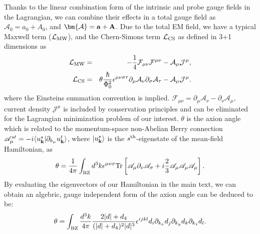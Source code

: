 \documentclass[aps,floatfix,prl]{revtex4}
\begin{document}
Thanks to the linear combination form of the intrinsic and probe gauge fields in the Lagrangian, we can combine their effects in a total gauge field as $\mathcal{A}_0=a_0+A_0$, and $\bm{\mathcal{A}}={\bf a}+{\bf A}$. Due to the total EM field, we have a typical Maxwell term ($\mathcal{L}_{\rm MW}$), and the Chern-Simons term $\mathcal{L}_{\rm CS}$ as defined in 3+1 dimensions as\cite{zhang_prb,JMoore,CSGL_rest}
\begin{eqnarray}
\mathcal{L}_{\rm MW}&=&-\frac{1}{4}\mathcal{F}_{\mu\nu}\mathcal{F}^{\mu\nu}-\mathcal{A}_{\mu}\mathcal{J}^{\mu},\\
\mathcal{L}_{\rm CS}&=& \theta\frac{\hbar}{\Phi_0^2}\epsilon^{\mu\nu\sigma\tau}\partial_{\mu}\mathcal{A}_{\nu}\partial_{\sigma}\mathcal{A}_{\tau}-\mathcal{A}_{\mu}\mathcal{J}^{\mu}.
\label{CS}
\end{eqnarray}
where the Einsteins summation convention is implied. $\mathcal{F}_{\mu\nu}=\partial_{\mu}\mathcal{A}_{\nu}-\partial_{\nu}\mathcal{A}_{\mu}$, current density $\mathcal{J}^{\mu}$ is included by conservation principles and can be eliminated for the Lagrangian minimization problem of our interest. $\theta$ is the axion angle which is related to the momentum-space non-Abelian Berry connection $\mathscr{A}^{st}_{\mu}=-i\langle u^{s}_{\bf k}|\partial_{k_{\mu}}u^{t}_{\bf k}\rangle$, where $|u^s_{\bf k}\rangle$ is the $s^{\rm th}$-eigenstate of the mean-field Hamiltonian,\cite{zhang_nat} as
\begin{eqnarray}
\theta=\frac{1}{4\pi}\int_{\rm BZ}d^3k \epsilon^{\mu\nu\sigma}{\rm Tr}\left[{\mathscr{A}}_{\mu}\partial_{\nu}{\mathscr{A}}_{\sigma}+i\frac{2}{3}{\mathscr{A}}_{\mu}{\mathscr{ A}}_{\mu}{\mathscr{A}}_{\mu}\right].
\end{eqnarray}
By evaluating the eigenvectors of our Hamiltonian in the main text, we can obtain an algebric, gauge independent form of the axion angle can be deduced to be:
\begin{eqnarray}
\theta=\int_{\rm BZ}\frac{d^3k}{4\pi} \frac{2|d|+d_4}{(|d|+d_4)^2|d|^3}\epsilon^{ijkl}d_i\partial_{k_x} d_j\partial_{k_y} d_k\partial_{k_z} d_l.
\label{ax_2}
\end{eqnarray}
\end{document}
